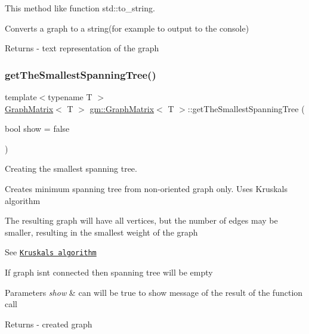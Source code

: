 This method like function std\+::to\+\_\+string. 

Converts a graph to a string(for example to output to the console) \begin{DoxyReturn}{Returns}
-\/ text representation of the graph 
\end{DoxyReturn}
\mbox{\label{classgm_1_1_graph_matrix_a8e60714a5f3b6fae8c04be67bbf8b56c}} 
\subsubsection{\texorpdfstring{get\+The\+Smallest\+Spanning\+Tree()}{getTheSmallestSpanningTree()}}
{\footnotesize\ttfamily template$<$typename T $>$ \\
\mbox{\hyperlink{classgm_1_1_graph_matrix}{Graph\+Matrix}}$<$ T $>$ \mbox{\hyperlink{classgm_1_1_graph_matrix}{gm\+::\+Graph\+Matrix}}$<$ T $>$\+::get\+The\+Smallest\+Spanning\+Tree (\begin{DoxyParamCaption}\item[{bool}]{show = {\ttfamily false} }\end{DoxyParamCaption})}



Creating the smallest spanning tree. 

Creates minimum spanning tree from non-\/oriented graph only. Uses Kruskal\textquotesingle{}s algorithm

The resulting graph will have all vertices, but the number of edges may be smaller, resulting in the smallest weight of the graph

See \href{https://en.wikipedia.org/wiki/Kruskal%27s_algorithm}{\tt Kruskal\textquotesingle{}s algorithm}

If graph isn\textquotesingle{}t connected then spanning tree will be empty 
\begin{DoxyParams}{Parameters}
{\em show} & can will be true to show message of the result of the function call \\
\hline
\end{DoxyParams}
\begin{DoxyReturn}{Returns}
-\/ created graph 
\end{DoxyReturn}
\mbox{\label{classgm_1_1_graph_matrix_a2dd4beb317ef1742df02eee6581c1194}} 
